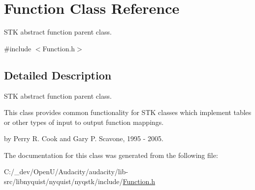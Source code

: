 \hypertarget{class_function}{}\section{Function Class Reference}
\label{class_function}


S\+TK abstract function parent class.  




{\ttfamily \#include $<$Function.\+h$>$}



\subsection{Detailed Description}
S\+TK abstract function parent class. 

This class provides common functionality for S\+TK classes which implement tables or other types of input to output function mappings.

by Perry R. Cook and Gary P. Scavone, 1995 -\/ 2005. 

The documentation for this class was generated from the following file\+:\begin{DoxyCompactItemize}
\item 
C\+:/\+\_\+dev/\+Open\+U/\+Audacity/audacity/lib-\/src/libnyquist/nyquist/nyqstk/include/\hyperlink{_function_8h}{Function.\+h}\end{DoxyCompactItemize}
